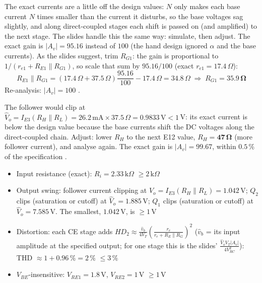 \documentclass[11pt]{article}
\begin{document}
The exact currents are a little off the design values: $N$ only makes each base current $N$ times smaller than the current it disturbs, so the base voltages sag slightly, and along direct-coupled stages each shift is passed on (and amplified) to the next stage. The slides handle this the same way: simulate, then adjust. The exact gain is $|A_v| = 95.16$ instead of $100$ (the hand design ignored $\alpha$ and the base currents). As the slides suggest, trim $R_{G1}$: the gain is proportional to $1/(r_{e1} + R_{E1}\|R_{G1})$, so scale that sum by $95.16/100$ (exact $r_{e1} = 17.4\,\Omega$):\[R_{E1}\|R_{G1} = (17.4\,\Omega + 37.5\,\Omega)\frac{95.16}{100} - 17.4\,\Omega = 34.8\,\Omega \;\Rightarrow\; R_{G1} = \mathbf{35.9\,\Omega}\]Re-analysis: $|A_v| = 100$ \checkmark. \par The follower would clip at $\hat V_o = I_{E3}(R_H\|R_L) = 26.2\,\mathrm{m}\mathrm{A}\times37.5\,\Omega = 0.9833\,\mathrm{V} < 1$\,V: its exact current is below the design value because the base currents shift the DC voltages along the direct-coupled chain. Adjust: lower $R_H$ to the next E12 value, $R_H = \mathbf{47\,\Omega}$ (more follower current), and analyse again. The exact gain is $|A_v| = 99.67$, within $0.5\,\%$ of the specification \checkmark. \begin{itemize}[leftmargin=*,itemsep=2pt]
\item Input resistance (exact): $R_i = 2.33\,\mathrm{k}\Omega$ $\ge 2\,\mathrm{k}\Omega$ \checkmark
\item Output swing: follower current clipping at $\hat V_o = I_{E3}(R_H\|R_L) = 1.042\,\mathrm{V}$; $Q_{2}$ clips (saturation or cutoff) at $\hat V_o = 1.885\,\mathrm{V}$; $Q_{1}$ clips (saturation or cutoff) at $\hat V_o = 7.585\,\mathrm{V}$. The smallest, $1.042\,\mathrm{V}$, is $\ge 1$\,V \checkmark
\item Distortion: each CE stage adds $HD_2 \approx \frac{\hat v_b}{4V_T}\left(\frac{r_e}{r_e + R_E\|R_G}\right)^2$ ($\hat v_b$ = its input amplitude at the specified output; for one stage this is the slides' $\frac{\hat V_o V_T |A_v|}{4V_{RC}^2}$): THD $\approx 1 + 0.96\,\% = 2\,\%$ $\le 3\,\%$ \checkmark
\item $V_{BE}$-insensitive: $V_{RE1} = 1.8$\,V, $V_{RE2} = 1$\,V $\ge 1$\,V \checkmark
\end{itemize}
\end{document}
